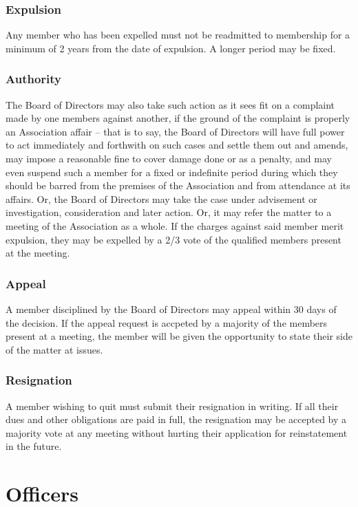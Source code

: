 \documentclass[12pt,letterpaper]{article}
\begin{document}
\subsubsection{Expulsion}
Any member who has been expelled must not be readmitted to membership for a minimum of 2 years from the date of expulsion. A longer period may be fixed.

\subsubsection{Authority}
The Board of Directors may also take such action as it sees fit on a complaint made by one members against another, if the ground of the complaint is properly an Association affair -- that is to say, the Board of Directors will have full power to act immediately and forthwith on such cases and settle them out and amends, may impose a reasonable fine to cover damage done or as a penalty, and may even suspend such a member for a fixed or indefinite period during which they should be barred from the premises of the Association and from attendance at its affairs. Or, the Board of Directors may take the case under advisement or investigation, consideration and later action. Or, it may refer the matter to a meeting of the Association as a whole. If the charges against said member merit expulsion, they may be expelled by a 2/3 vote of the qualified members present at the meeting.

\subsubsection{Appeal}
A member disciplined by the Board of Directors may appeal within 30 days of the decision. If the appeal request is accpeted by a majority of the members present at a meeting, the member will be given the opportunity to state their side of the matter at issues.

\subsubsection{Resignation}
A member wishing to quit must submit their resignation in writing. If all their dues and other obligations are paid in full, the resignation may be accepted by a majority vote at any meeting without hurting their application for reinstatement in the future.

\section{Officers}
\end{document}
